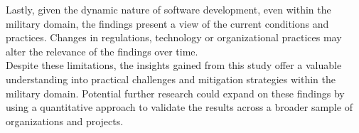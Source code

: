 Lastly, given the dynamic nature of software development, even within the military domain, the findings present a view of the current conditions and practices. Changes in regulations, technology or organizational practices may alter the relevance of the findings over time.\\

Despite these limitations, the insights gained from this study offer a valuable understanding into practical challenges and mitigation strategies within the military domain. Potential further research could expand on these findings by using a quantitative approach to validate the results across a broader sample of organizations and projects.
